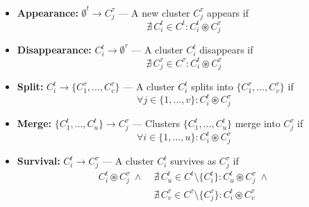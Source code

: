 \begin{itemize}
    \item \textbf{Appearance:} $\emptyset^t \rightarrow C_j^\tau$ — A new cluster $C_j^\tau$ appears if
              {\small
                  \begin{equation*}
                      \nexists\, C_i^t \in C^t : C_i^t \circledast C_j^\tau
                  \end{equation*}
              }

    \item \textbf{Disappearance:} $C_i^t \rightarrow \emptyset^\tau$ — A cluster $C_i^t$ disappears if
              {\small
                  \begin{equation*}
                      \nexists\, C_j^\tau \in C^\tau : C_i^t \circledast C_j^\tau
                  \end{equation*}
              }

    \item \textbf{Split:} $C_i^t \rightarrow \{C_1^\tau, \dots, C_v^\tau\}$ — A cluster $C_i^t$ splits into $\{C_1^\tau, \dots, C_v^\tau\}$ if
              {\small
                  \begin{equation*}
                      \forall j \in \{1,\dots,v\}: C_i^t \circledast C_j^\tau
                  \end{equation*}
              }

    \item \textbf{Merge:} $\{C_1^t, \dots, C_u^t\} \rightarrow C_j^\tau$ — Clusters $\{C_1^t, \dots, C_u^t\}$ merge into $C_j^\tau$ if
              {\small
                  \begin{equation*}
                      \forall i \in \{1,\dots,u\}: C_i^t \circledast C_j^\tau
                  \end{equation*}
              }

    \item \textbf{Survival:} $C_i^t \rightarrow C_j^\tau$ — A cluster $C_i^t$ survives as $C_j^\tau$ if
              {\footnotesize
                  \begin{equation*}
                      \begin{aligned}
                          C_i^t \circledast C_j^\tau \;\land\;
                           & \nexists\, C_u^t \in C^t \setminus \{C_i^t\}: C_u^t \circledast C_j^\tau \;\land  \\
                           & \nexists\, C_v^\tau \in C^\tau \setminus \{C_j^\tau\}: C_i^t \circledast C_v^\tau
                      \end{aligned}
                  \end{equation*}
              }
\end{itemize}

